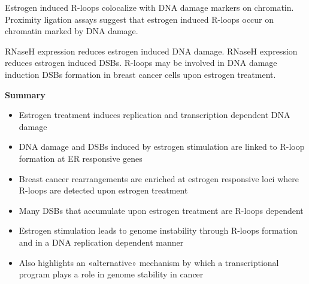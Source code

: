 Estrogen induced R-loops colocalize with DNA damage markers on chromatin. Proximity ligation assays suggest that estrogen induced R-loops occur on chromatin marked by DNA damage.

RNaseH expression reduces estrogen induced DNA damage. RNaseH expression reduces estrogen induced DSBs. R-loops may be involved in DNA damage induction DSBs formation in breast cancer cells upon estrogen treatment.

\textbf{Summary}

\begin{itemize}
\tightlist
\item
  Estrogen treatment induces replication and transcription dependent DNA damage
\item
  DNA damage and DSBs induced by estrogen stimulation are linked to R-loop formation at ER responsive genes
\item
  Breast cancer rearrangements are enriched at estrogen responsive loci where R-loops are detected upon estrogen treatment
\item
  Many DSBs that accumulate upon estrogen treatment are R-loops dependent
\item
  Estrogen stimulation leads to genome instability through R-loops formation and in a DNA
  replication dependent manner
\item
  Also highlights an «alternative» mechanism by which a transcriptional program plays a role in genome stability in cancer
\end{itemize}
